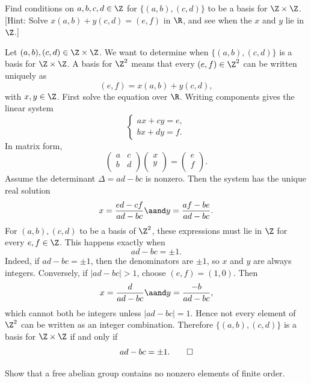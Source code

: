 \begin{problem}[19.4]
  Find conditions on $a, b, c, d \in \Z$ for $\{(a, b), (c, d)\}$ to be a basis for $\Z \times \Z$. [Hint: Solve $x(a, b) + y(c, d) = (e, f)$ in $\R$, and see when the $x$ and $y$ lie in $\Z$.]
\end{problem}

\begin{solution}
  Let $(a, b), (c, d) \in \Z \times \Z$. We want to determine when $\{(a, b), (c, d)\}$ is a basis for $\Z \times \Z$. A basis for $\Z^2$ means that every $(e, f) \in \Z^2$ can be written uniquely as
  \[%
    (e, f) = x(a, b) + y(c, d)
  ,\]%
  with $x, y \in \Z$. First solve the equation over $\R$. Writing components gives the linear system
  \[%
    \begin{cases}
      ax + cy = e, \\
      bx + dy = f.
    \end{cases}
  \]%
  In matrix form,
  \[%
    \begin{pmatrix}
      a & c \\
      b & d \\
    \end{pmatrix}
    \begin{pmatrix}
      x \\
      y \\
    \end{pmatrix}
    = \begin{pmatrix}
      e \\
      f \\
    \end{pmatrix}
  .\]%
  Assume the determinant $\Delta = ad - bc$ is nonzero. Then the system has the unique real solution
  \[%
    x = \frac{ed - cf}{ad - bc} \aand y = \frac{af - be}{ad - bc}
  .\]%
  For $(a, b), (c, d)$ to be a basis of $\Z^2$, these expressions must lie in $\Z$ for every $e, f \in \Z$. This happens exactly when
  \[%
    ad - bc = \pm 1
  .\]%
  Indeed, if $ad - bc = \pm 1$, then the denominators are $\pm 1$, so $x$ and $y$ are always integers. Conversely, if $|ad - bc| > 1$, choose $(e, f) = (1, 0)$. Then
  \[%
    x = \frac{d}{ad - bc} \aand y = \frac{-b}{ad - bc}
  ,\]%
  which cannot both be integers unless $|ad - bc| = 1$. Hence not every element of $\Z^2$ can be written as an integer combination. Therefore $\{(a,b),(c,d)\}$ is a basis for $\Z \times \Z$ if and only if
  \[%
    ad - bc = \pm 1
  .\qedhere\]%
\end{solution}

\begin{problem}[19.10]
  Show that a free abelian group contains no nonzero elements of finite order.
\end{problem}

